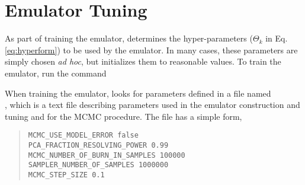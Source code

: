 \section{Emulator Tuning}\label{sec:emulatortuning}

As part of training the emulator,  determines the hyper-parameters ($\Theta_k$ in Eq. \eqref{eq:hyperform}) to be used by the emulator. In many cases, these parameters are simply chosen \emph{ad hoc}, but  initializes them to reasonable values. To train the emulator, run the command


When training the emulator,  looks for parameters defined in a file named\\ , which is a text file describing parameters used in the emulator construction and tuning and for the MCMC procedure. The file has a simple form, 

\begin{quote}
{\tt MCMC\_USE\_MODEL\_ERROR             false}\\
{\tt PCA\_FRACTION\_RESOLVING\_POWER     0.99}\\
{\tt MCMC\_NUMBER\_OF\_BURN\_IN\_SAMPLES 100000}\\
{\tt SAMPLER\_NUMBER\_OF\_SAMPLES           1000000}\\
{\tt MCMC\_STEP\_SIZE                    0.1}
\end{quote}

